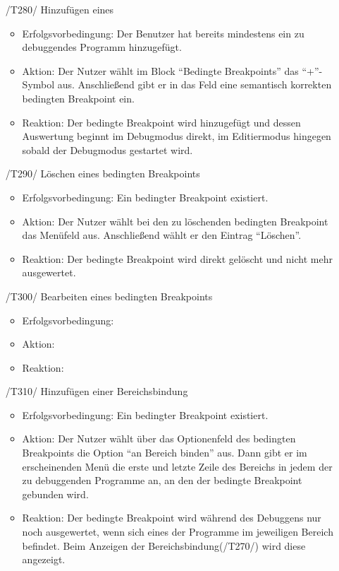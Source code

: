 \documentclass[parskip=full]{scrartcl}
\let\glsplgen\glsuseri
\begin{document}
\begin{itemize}

	\item[/T280/] Hinzufügen eines \glsplgen{bedingter Breakpoint}
		\begin{itemize}
		\item Erfolgsvorbedingung: Der Benutzer hat bereits mindestens ein zu debuggendes Programm hinzugefügt.
		\item Aktion: Der Nutzer wählt im Block \enquote{Bedingte Breakpoints} das \enquote{+}-Symbol aus. Anschließend gibt er in das Feld eine semantisch korrekten bedingten Breakpoint ein.
		\item Reaktion:	Der bedingte Breakpoint wird hinzugefügt und dessen Auswertung beginnt im Debugmodus direkt, im Editiermodus hingegen sobald der Debugmodus gestartet wird.	
		\end{itemize}	
	
	\item[/T290/] Löschen eines bedingten Breakpoints
		\begin{itemize}
		\item Erfolgsvorbedingung: Ein bedingter Breakpoint existiert.
		\item Aktion: Der Nutzer wählt bei den zu löschenden bedingten Breakpoint das Menüfeld aus. Anschließend wählt er den Eintrag \enquote{Löschen}.
		\item Reaktion:	Der bedingte Breakpoint wird direkt gelöscht und nicht mehr ausgewertet.	
		\end{itemize}	
	
	\item[/T300/] Bearbeiten eines bedingten Breakpoints
		\begin{itemize}
		\item Erfolgsvorbedingung:
		\item Aktion:
		\item Reaktion:		
		\end{itemize}	
	
	\item[/T310/] Hinzufügen einer Bereichsbindung
		\begin{itemize}
		\item Erfolgsvorbedingung: Ein bedingter Breakpoint existiert.
		\item Aktion: Der Nutzer wählt über das Optionenfeld des bedingten Breakpoints die Option \enquote{an Bereich binden} aus. Dann gibt er im erscheinenden Menü die erste und letzte Zeile des Bereichs in jedem der zu debuggenden Programme an, an den der bedingte Breakpoint gebunden wird. 
		\item Reaktion:	Der bedingte Breakpoint wird während des Debuggens nur noch ausgewertet, wenn sich eines der Programme im jeweiligen Bereich befindet. Beim Anzeigen der Bereichsbindung(/T270/) wird diese angezeigt. 
		\end{itemize}		
	

\end{itemize}
\end{document}

